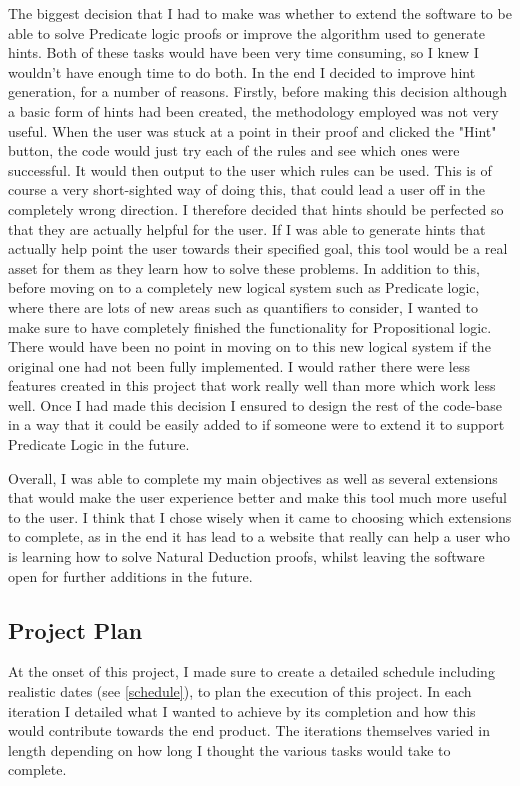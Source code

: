 The biggest decision that I had to make was whether to extend the software to be able to solve Predicate logic proofs or improve the algorithm used to generate hints. Both of these tasks would have been very time consuming, so I knew I wouldn't have enough time to do both. In the end I decided to improve hint generation, for a number of reasons. Firstly, before making this decision although a basic form of hints had been created, the methodology employed was not very useful. When the user was stuck at a point in their proof and clicked the "Hint" button,  the code would just try each of the rules and see which ones were successful. It would then output to the user which rules can be used. This is of course a very short-sighted way of doing this, that could lead a user off in the completely wrong direction. I therefore decided that hints should be perfected so that they are actually helpful for the user. If I was able to generate hints that actually help point the user towards their specified goal, this tool would be a real asset for them as they learn how to solve these problems. In addition to this, before moving on to a completely new logical system such as Predicate logic, where there are lots of new areas such as quantifiers to consider, I wanted to make sure to have completely finished the functionality for Propositional logic. There would have been no point in moving on to this new logical system if the original one had not been fully implemented. I would rather there were less features created in this project that work really well than more which work less well. Once I had made this decision I ensured to design the rest of the code-base in a way that it could be easily added to if someone were to extend it to support Predicate Logic in the future. 

Overall, I was able to complete my main objectives as well as several extensions that would make the user experience better and make this tool much more useful to the user. I think that I chose wisely when it came to choosing which extensions to complete, as in the end it has lead to a website that really can help a user who is learning how to solve Natural Deduction proofs, whilst leaving the software open for further additions in the future.

\subsection{Project Plan}

At the onset of this project, I made sure to create a detailed schedule including realistic dates (see \ref{schedule}), to plan the execution of this project. In each iteration I detailed what I wanted to achieve by its completion and how this would contribute towards the end product. The iterations themselves varied in length depending on how long I thought the various tasks would take to complete.

